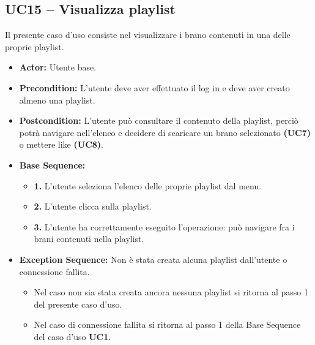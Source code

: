 \subsection{UC15 -- Visualizza playlist}
Il presente caso d'uso consiste nel visualizzare i brano contenuti in una delle proprie playlist. 
\begin{itemize}
    \item \textbf{Actor:} Utente base.
    \item \textbf{Precondition:} L'utente deve aver effettuato il log in e deve aver creato almeno una playlist.
    \item \textbf{Postcondition:} L'utente può consultare il contenuto della 
    playlist, perciò potrà navigare nell'elenco e decidere di scaricare 
    un brano selezionato \textbf{(UC7)} o mettere like \textbf{(UC8)}.
    \item \textbf{Base Sequence:}
    \begin{itemize}
        \item \textbf{1.} L'utente seleziona l'elenco delle proprie playlist dal menu.
        \item \textbf{2.} L'utente clicca sulla playlist.
        \item \textbf{3.} L'utente ha correttamente eseguito l'operazione: può navigare fra i brani contenuti nella playlist.
    \end{itemize}
    \item \textbf{Exception Sequence:} Non è stata creata alcuna playlist dall'utente o connessione fallita.
    \begin{itemize}
        \item Nel caso non sia stata creata ancora nessuna playlist si ritorna al passo 1 del presente caso d'uso.
        \item Nel caso di connessione fallita si ritorna al passo 1 della Base Sequence del caso d'uso \textbf{UC1}.
    \end{itemize}
\end{itemize}
\vspace{1cm}

